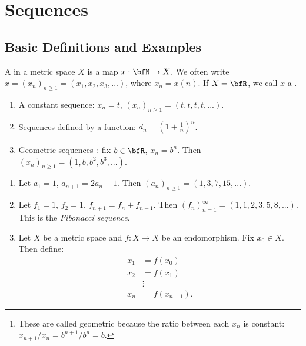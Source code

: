 \chapter{Sequences}\label{chapter:sequences}
\vspace{12pt}

\section{Basic Definitions and Examples}
    \begin{definition}
        A  in a metric space $X$ is a map $x: \bfN \rightarrow X$. We often write $x = (x_n)_{n \geq 1} = (x_1,x_2,x_3,...)$, where $x_n = x(n)$. If $X = \bfR$, we call $x$ a .
    \end{definition}

    \begin{example}
        \phantom{a}
        \begin{enumerate}[label = (\arabic*)]
            \item A constant sequence: $x_n = t$, $ (x_n)_{n \geq 1} = (t,t,t,t,...)$.
            \item Sequences defined by a function: $d_n = (1+\frac{1}{n})^n$.
            \item Geometric sequences\footnote{These are called geometric because the ratio between each $x_n$ is constant: $x_{n+1}/x_n = b^{n+1}/b^n = b$.}: fix $b \in \bfR$, $x_n = b^n$. Then $(x_n)_{n \geq 1} = (1,b,b^2,b^3,...)$.
        \end{enumerate}
    \end{example}

    \begin{example}
        \phantom{a}
        \begin{enumerate}[label = (\arabic*)]
            \item Let $a_1 = 1$, $a_{n+1} = 2a_n + 1$. Then $(a_n)_{n \geq 1} = (1,3,7,15,...)$.
            \item Let $f_1 = 1$, $f_2 = 1$, $f_{n+1} = f_n + f_{n-1}$. Then $(f_n)_{n=1}^\infty = (1,1,2,3,5,8,...)$. This is the \textit{Fibonacci sequence}.
            \item Let $X$ be a metric space and $f:X \rightarrow X$ be an endomorphism. Fix $x_0 \in X$. Then define:
                \begin{equation*}
                \begin{split}
                    x_1 &= f(x_0) \\
                    x_2 &= f(x_1) \\
                    &\vdots \\
                    x_n &= f(x_{n-1}).
                \end{split}
                \end{equation*}
        \end{enumerate}
    \end{example}

